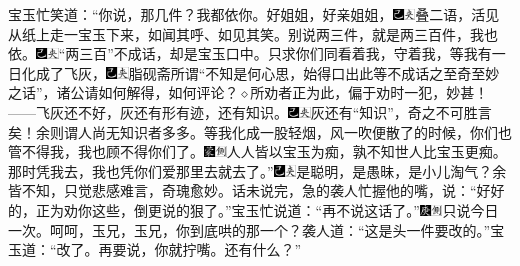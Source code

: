 宝玉忙笑道：“你说，那几件？我都依你。好姐姐，好亲姐姐，{\includegraphics[width=3mm]{../Images/00003}\includegraphics[width=3mm]{../Images/00012}\footnotesize \kaishu 叠二语，活见从纸上走一宝玉下来，如闻其呼、如见其笑。}别说两三件，就是两三百件，我也依。{\includegraphics[width=3mm]{../Images/00003}\includegraphics[width=3mm]{../Images/00012}\footnotesize \kaishu “两三百”不成话，却是宝玉口中。}只求你们同看着我，守着我，等我有一日化成了飞灰，{\includegraphics[width=3mm]{../Images/00003}\includegraphics[width=3mm]{../Images/00012}\footnotesize \kaishu 脂砚斋所谓“不知是何心思，始得口出此等不成话之至奇至妙之话”，诸公请如何解得，如何评论？{$\diamond$}所劝者正为此，偏于劝时一犯，妙甚！}------飞灰还不好，灰还有形有迹，还有知识。{\includegraphics[width=3mm]{../Images/00003}\includegraphics[width=3mm]{../Images/00012}\footnotesize \kaishu 灰还有“知识”，奇之不可胜言矣！余则谓人尚无知识者多多。}等我化成一股轻烟，风一吹便散了的时候，你们也管不得我，我也顾不得你们了。{\includegraphics[width=3mm]{../Images/00006}\includegraphics[width=3mm]{../Images/00011}\footnotesize \kaishu 人人皆以宝玉为痴，孰不知世人比宝玉更痴。}那时凭我去，我也凭你们爱那里去就去了。”{\includegraphics[width=3mm]{../Images/00003}\includegraphics[width=3mm]{../Images/00012}\footnotesize \kaishu 是聪明，是愚昧，是小儿淘气？余皆不知，只觉悲感难言，奇瑰愈妙。}话未说完，急的袭人忙握他的嘴，说：“好好的，正为劝你这些，倒更说的狠了。”宝玉忙说道：“再不说这话了。”{\includegraphics[width=3mm]{../Images/00004}\includegraphics[width=3mm]{../Images/00011}\footnotesize \kaishu 只说今日一次。呵呵，玉兄，玉兄，你到底哄的那一个？}袭人道：“这是头一件要改的。”宝玉道：“改了。再要说，你就拧嘴。还有什么？”

